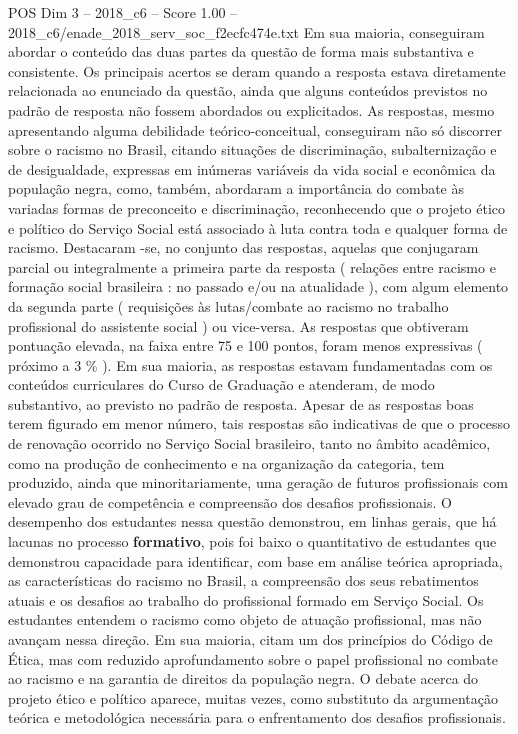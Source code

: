 \begin{textsample}{POS Dim 3 – 2018\_c6 – Score 1.00 – 2018\_c6/enade\_2018\_serv\_soc\_f2ecfc474e.txt}
Em sua maioria, conseguiram abordar o conteúdo das duas partes da questão de forma mais substantiva e consistente.
Os principais acertos se deram quando a resposta estava diretamente relacionada ao enunciado da questão, ainda que alguns conteúdos previstos no padrão de resposta não fossem abordados ou explicitados.
As respostas, mesmo apresentando alguma debilidade teórico-conceitual, conseguiram não só discorrer sobre o racismo no Brasil, citando situações de discriminação, subalternização e de desigualdade, expressas em inúmeras variáveis da vida social e econômica da população negra, como, também, abordaram a importância do combate às variadas formas de preconceito e discriminação, reconhecendo que o projeto ético e político do Serviço Social está associado à luta contra toda e qualquer forma de racismo.
Destacaram -se, no conjunto das respostas, aquelas que conjugaram parcial ou integralmente a primeira parte da resposta ( relações entre racismo e formação social brasileira : no passado e/ou na atualidade ), com algum elemento da segunda parte ( requisições às lutas/combate ao racismo no trabalho profissional do assistente social ) ou vice-versa.
As respostas que obtiveram pontuação elevada, na faixa entre 75 e 100 pontos, foram menos expressivas ( próximo a 3 \% ).
Em sua maioria, as respostas estavam fundamentadas com os conteúdos curriculares do Curso de Graduação e atenderam, de modo substantivo, ao previsto no padrão de resposta.
Apesar de as respostas boas terem figurado em menor número, tais respostas são indicativas de que o processo de renovação ocorrido no Serviço Social brasileiro, tanto no âmbito acadêmico, como na produção de conhecimento e na organização da categoria, tem produzido, ainda que minoritariamente, uma geração de futuros profissionais com elevado grau de competência e compreensão dos desafios profissionais.
O desempenho dos estudantes nessa questão demonstrou, em linhas gerais, que há lacunas no processo \textbf{formativo}, pois foi baixo o quantitativo de estudantes que demonstrou capacidade para identificar, com base em análise teórica apropriada, as características do racismo no Brasil, a compreensão dos seus rebatimentos atuais e os desafios ao trabalho do profissional formado em Serviço Social.
Os estudantes entendem o racismo como objeto de atuação profissional, mas não avançam nessa direção.
Em sua maioria, citam um dos princípios do Código de Ética, mas com reduzido aprofundamento sobre o papel profissional no combate ao racismo e na garantia de direitos da população negra.
O debate acerca do projeto ético e político aparece, muitas vezes, como substituto da argumentação teórica e metodológica necessária para o enfrentamento dos desafios profissionais.

\end{textsample}
